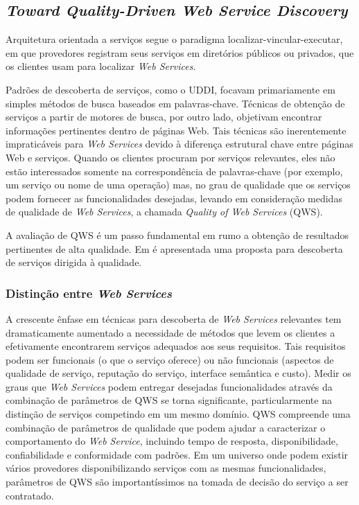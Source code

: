 \subsection{\textit{Toward Quality-Driven Web Service Discovery} \cite{al2008toward}} \label{sec:quality-driven-discovery}

Arquitetura orientada a serviços segue o paradigma localizar-vincular-executar, em que provedores registram seus serviços em diretórios públicos ou privados, que os clientes usam para localizar \textit{Web Services}.

Padrões de descoberta de serviços, como o UDDI, focavam primariamente em simples métodos de busca baseados em palavras-chave. Técnicas de obtenção de serviços a partir de motores de busca, por outro lado, objetivam encontrar informações pertinentes dentro de páginas Web. Tais técnicas são inerentemente impraticáveis para \textit{Web Services} devido à diferença estrutural chave entre páginas Web e serviços. Quando os clientes procuram por serviços relevantes, eles não estão interessados somente na correspondência de palavras-chave (por exemplo, um serviço ou nome de uma operação) mas, no grau de qualidade que os serviços podem fornecer as funcionalidades desejadas, levando em consideração medidas de qualidade de \textit{Web Services}, a chamada \textit{Quality of Web Services} (QWS).

A avaliação de QWS é um passo fundamental em rumo a obtenção de resultados pertinentes de alta qualidade. Em \cite{al2008toward} é apresentada uma proposta para descoberta de serviços dirigida à qualidade.

\subsubsection{Distinção entre \textit{Web Services}}

A crescente ênfase em técnicas para descoberta de \textit{Web Services} relevantes tem dramaticamente aumentado a necessidade de métodos que levem os clientes a efetivamente encontrarem serviços adequados aos seus requisitos. Tais requisitos podem ser funcionais (o que o serviço oferece) ou não funcionais (aspectos de qualidade de serviço, reputação do serviço, interface semântica e custo). Medir os graus que \textit{Web Services} podem entregar desejadas funcionalidades através da combinação de parâmetros de QWS se torna significante, particularmente na distinção de serviços competindo em um mesmo domínio. QWS compreende uma combinação de parâmetros de qualidade que podem ajudar a caracterizar o comportamento do \textit{Web Service}, incluindo tempo de resposta, disponibilidade, confiabilidade e conformidade com padrões. Em um universo onde podem existir vários provedores disponibilizando serviços com as mesmas funcionalidades, parâmetros de QWS são importantíssimos na tomada de decisão do serviço a ser contratado.

